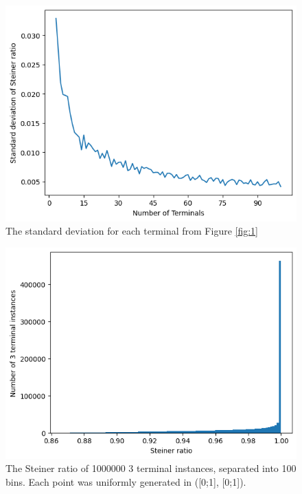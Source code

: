 \documentclass{mpaper}
\begin{document}
  \begin{figure}
    \begin{center}
    \includegraphics[scale=0.5]{plot3.png}
    \end{center}
    \caption{\label{fig:3} The standard deviation for each terminal from Figure \ref{fig:1}}
\end{figure}
  
\begin{figure}
  \begin{center}
  \includegraphics[scale=0.5]{plot4.png}
  \end{center}
  \caption{\label{fig:4} The Steiner ratio of 1000000 3 terminal instances, separated into 100 bins. Each point was uniformly generated in ([0;1], [0;1]).}
\end{figure}
\end{document}
